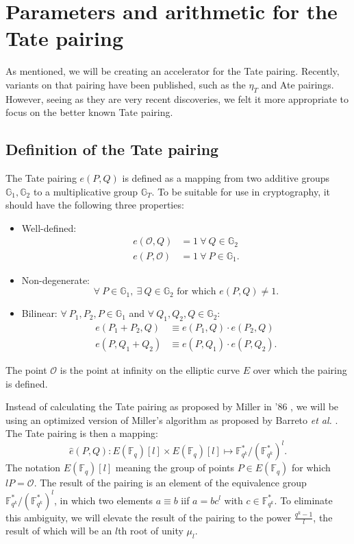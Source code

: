 \section{Parameters and arithmetic for the Tate pairing\label{section-pairings}}

As mentioned, we will be creating an accelerator for the Tate pairing. Recently, variants on that pairing have been published, such as the $\eta_T$ \cite{eta} and Ate \cite{ate} pairings. However, seeing as they are very recent discoveries, we felt it more appropriate to focus on the better known Tate pairing.

\subsection{Definition of the Tate pairing}

The Tate pairing $e(P, Q)$ is defined as a mapping from two additive groups $\mathbb{G}_1, \mathbb{G}_2$ to a multiplicative group $\mathbb{G}_T$. To be suitable for use in cryptography, it should have the following three properties:
\begin{itemize}
	\item Well-defined:%
		\[\begin{aligned}
			e(\mathcal{O}, Q) &= 1 \: \forall \: Q \in \mathbb{G}_2\\
			e(P, \mathcal{O}) &= 1 \: \forall \: P \in \mathbb{G}_1.
		\end{aligned}\]
	
	\item Non-degenerate:%
		\[\forall \: P \in \mathbb{G}_1, \: \exists \: Q \in \mathbb{G}_2 \text{ for which } e(P, Q) \neq 1.\]
	
	\item Bilinear: $\forall \: P_1, P_2, P \in \mathbb{G}_1$ and $\forall \: Q_1, Q_2, Q \in \mathbb{G}_2$:%
		\[\begin{aligned}
			e(P_1 + P_2, Q) &\equiv e(P_1, Q) \cdot e(P_2, Q)\\
			e(P, Q_1 + Q_2) &\equiv e(P, Q_1) \cdot e(P, Q_2).
		\end{aligned}\]
\end{itemize}
The point $\mathcal{O}$ is the point at infinity on the elliptic curve $E$ over which the pairing is defined.

Instead of calculating the Tate pairing as proposed by Miller in '86 \cite{miller}, we will be using an optimized version of Miller's algorithm as proposed by Barreto \emph{et al.} \cite{barreto-efficient}. The Tate pairing is then a mapping:
\begin{displaymath}
\hat{e}(P, Q) : E(\mathbb{F}_q) [l] \times E(\mathbb{F}_q) [l] \mapsto \mathbb{F}_{q^k}^*/(\mathbb{F}_{q^k}^*)^l.
\end{displaymath}
The notation $E(\mathbb{F}_q) [l]$ meaning the group of points $P \in E(\mathbb{F}_q)$ for which $l P = \mathcal{O}$. The result of the pairing is an element of the equivalence group $\mathbb{F}_{q^k}^*/(\mathbb{F}_{q^k}^*)^l$, in which two elements $a \equiv b$ iif $a = bc^l$ with $c \in \mathbb{F}_{q^k}^*$. To eliminate this ambiguity, we will elevate the result of the pairing to the power $\frac{q^k - 1}{l}$, the result of which will be an $l$th root of unity $\mu_l$.

